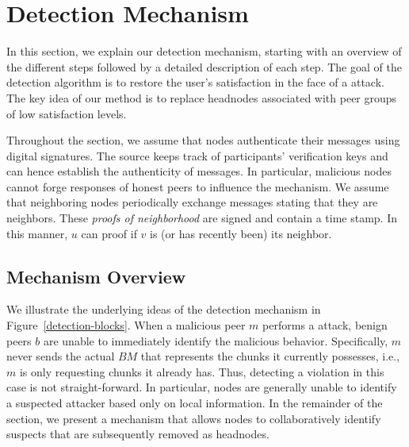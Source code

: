 \section{Detection Mechanism}
\label{sec:detection}


In this section, we explain our detection mechanism, starting with an overview of the different steps followed by a detailed description of each step.  
The goal of the detection algorithm is to restore the user's satisfaction in the face of a \drop attack. The key idea of our method is to replace headnodes associated with peer groups of low satisfaction levels. 

Throughout the section, we assume that nodes authenticate their messages using digital signatures. 
The source keeps track of participants' verification keys and can hence establish the authenticity of messages.
In particular, malicious nodes cannot forge responses of honest peers to influence the mechanism. 
We assume that neighboring nodes periodically exchange messages stating that they are neighbors.
These \emph{proofs of neighborhood} are signed and contain a time stamp. 
In this manner, $u$ can proof if $v$ is (or has recently been) its neighbor. 





\subsection{Mechanism Overview}
We illustrate the underlying ideas of the detection mechanism in Figure~\ref{detection-blocks}.
When a malicious peer $m$ performs a \drop attack, benign peers $b$ are unable to immediately identify the malicious behavior.
Specifically, $m$ never sends the actual $BM$ that represents the chunks it currently possesses, i.e., $m$ is only requesting chunks it already has. 
Thus, detecting a violation in this case is not straight-forward. In particular, nodes are generally unable to identify a suspected attacker based only on local information.
In the remainder of the section, we present a mechanism that allows nodes to collaboratively identify suspects that are subsequently removed as headnodes.  




